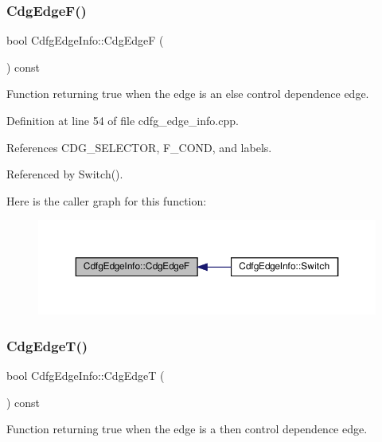 \subsubsection{\texorpdfstring{Cdg\+Edge\+F()}{CdgEdgeF()}}
{\footnotesize\ttfamily bool Cdfg\+Edge\+Info\+::\+Cdg\+EdgeF (\begin{DoxyParamCaption}{ }\end{DoxyParamCaption}) const}



Function returning true when the edge is an else control dependence edge. 



Definition at line 54 of file cdfg\+\_\+edge\+\_\+info.\+cpp.



References C\+D\+G\+\_\+\+S\+E\+L\+E\+C\+T\+OR, F\+\_\+\+C\+O\+ND, and labels.



Referenced by Switch().

Here is the caller graph for this function\+:
\nopagebreak
\begin{figure}[H]
\begin{center}
\leavevmode
\includegraphics[width=350pt]{d0/d89/structCdfgEdgeInfo_a6a08ecaafed49f5a28292b7157e0f39e_icgraph}
\end{center}
\end{figure}
\mbox{\label{structCdfgEdgeInfo_add12d0e8da8fb0f05ccfbb8fc54e4ef2}} 
\subsubsection{\texorpdfstring{Cdg\+Edge\+T()}{CdgEdgeT()}}
{\footnotesize\ttfamily bool Cdfg\+Edge\+Info\+::\+Cdg\+EdgeT (\begin{DoxyParamCaption}{ }\end{DoxyParamCaption}) const}



Function returning true when the edge is a then control dependence edge. 



